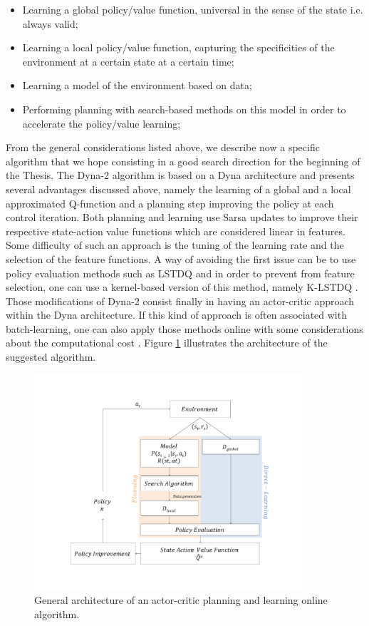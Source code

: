 \documentclass[]{article}
\begin{document}
\begin{itemize}
	\item Learning a global policy/value function, universal in the sense of the state i.e. always valid;
	\item Learning a local policy/value function, capturing the specificities of the environment at a certain state at a certain time;
	\item Learning a model of the environment based on data;
	\item Performing planning with search-based methods on this model in order to accelerate the policy/value learning;
\end{itemize}

\noindent From the general considerations listed above, we describe now a specific algorithm that we hope consisting in a good search direction for the beginning of the Thesis. The Dyna-2 algorithm \cite{silver2008sample} is based on a Dyna architecture and presents several advantages discussed above, namely the learning of a global and a local approximated Q-function and a planning step improving the policy at each control iteration. Both planning and learning use Sarsa updates to improve their respective state-action value functions which are considered linear in features. Some difficulty of such an approach is the tuning of the learning rate and the selection of the feature functions. A way of avoiding the first issue can be to use policy evaluation methods such as LSTDQ \cite{lagoudakis2003least} and in order to prevent from feature selection, one can use a kernel-based version of this method, namely K-LSTDQ \cite{xu2007kernel}. Those modifications of Dyna-2 consist finally in having an actor-critic approach within the Dyna architecture. If this kind of approach is often associated with batch-learning, one can also apply those methods online with some considerations about the computational cost \cite{busoniu2010reinforcement}. Figure \ref{algo_archi} illustrates the architecture of the suggested algorithm.

\begin{figure}[!h]
	\centering
	\includegraphics[width=0.9\textwidth]{img/algo_archi.pdf}
	\caption{General architecture of an actor-critic planning and learning online algorithm.}
	\label{algo_archi}
\end{figure}
\end{document}
